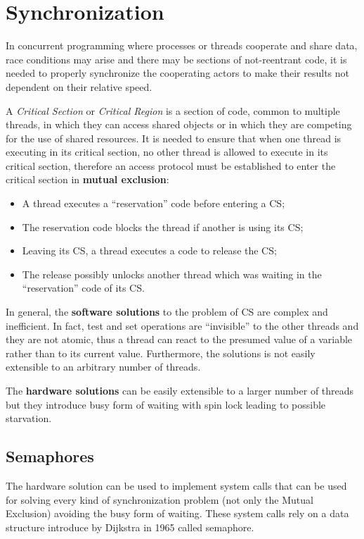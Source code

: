 \chapter{Synchronization}
In concurrent programming where processes or threads cooperate and share data, race conditions may arise and there may be sections of not-reentrant code, it is needed to properly synchronize the cooperating actors to make their results not dependent on their relative speed.

A \emph{Critical Section} or \emph{Critical Region} is a section of code, common to multiple threads, in which they can access shared objects or in which they are competing for the use of shared resources. It is needed to ensure that when one thread is executing in its critical section, no other thread is allowed to execute in its critical section, therefore an access protocol must be established to enter the critical section in \textbf{mutual exclusion}:

\begin{itemize}
\item A thread executes a ``reservation'' code before entering a CS;
\item The reservation code blocks the thread if another is using its CS;
\item Leaving its CS, a thread executes a code to release the CS;
\item The release possibly unlocks another thread which was waiting in the ``reservation'' code of its CS.
\end{itemize}

In general, the \textbf{software solutions} to the problem of CS are complex and inefficient. In fact, test and set operations are ``invisible'' to the other threads and they are not atomic, thus a thread can react to the presumed value of a variable rather than to its current value. Furthermore, the solutions is not easily extensible to an arbitrary number of threads.

The \textbf{hardware solutions} can be easily extensible to a larger number of threads but they introduce busy form of waiting with spin lock leading to possible starvation.

\section{Semaphores}
The hardware solution can be used to implement system calls that can be used for solving every kind of synchronization problem (not only the Mutual Exclusion) avoiding the busy form of waiting. These system calls rely on a data structure introduce by Dijkstra in 1965 called semaphore.

